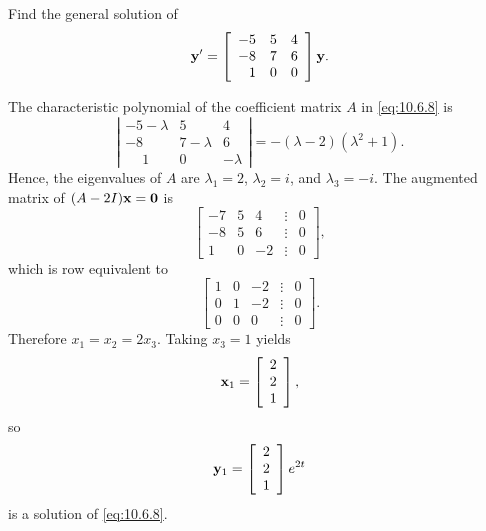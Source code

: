 \begin{example}
  \label{example:10.6.3} \rm Find the general solution of
  \begin{equation}
    \label{eq:10.6.8}{\bf y}'=\left[\begin{array}{rrr} -5&5&4\\-8&7&6\\1&0&0\end{array}\right]{\bf y}.
  \end{equation}
\end{example}

\begin{examplesolution}
\solution The characteristic polynomial of the coefficient matrix $A$ in \eqref{eq:10.6.8} is
\[
  \left|
  \begin{array}{ccc}
    -5-\lambda   & 5         & 4        \\
    -8           & 7-\lambda & 6        \\
    \phantom{-}1 & 0         & -\lambda
  \end{array}\right|=-(\lambda-2)(\lambda^{2}+1).
\]
Hence, the eigenvalues of $A$ are $\lambda_{1}=2$, $\lambda_{2}=i$, and $\lambda_{3}=-i$. The
augmented matrix of $(A-2I){\bf x=0}$ is
\[
  \left[
  \begin{array}{rrrcr}
    -7 & 5 & 4  & \vdots & 0 \\
    -8 & 5 & 6  & \vdots & 0 \\
    1  & 0 & -2 & \vdots & 0
  \end{array}\right],
\]
which is row equivalent to
\[
  \left[
  \begin{array}{rrrcr}
    1 & 0 & -2 & \vdots & 0 \\
    0 & 1 & -2 & \vdots & 0 \\
    0 & 0 & 0  & \vdots & 0
  \end{array}\right].
\]
Therefore $x_{1}=x_{2}=2x_{3}$. Taking $x_{3}=1$ yields
\[
  {\bf x}_{1}=\left[\begin{array}{r}2\\2\\1\end{array}\right],
\]
so
\[
  {\bf y}_{1}=\left[\begin{array}{r}2\\2\\1\end{array}\right]e^{2t}
\]
is a solution of \eqref{eq:10.6.8}.


\end{examplesolution}

